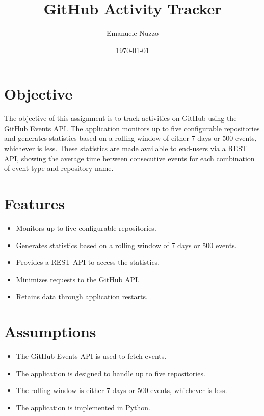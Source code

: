 \documentclass{article}
\title{GitHub Activity Tracker}
\author{Emanuele Nuzzo}
\date{\today}
\begin{document}
\maketitle

\section{Objective}
The objective of this assignment is to track activities on GitHub using the GitHub Events API. The application monitors up to five configurable repositories and generates statistics based on a rolling window of either 7 days or 500 events, whichever is less. These statistics are made available to end-users via a REST API, showing the average time between consecutive events for each combination of event type and repository name.

\section{Features}
\begin{itemize}
    \item Monitors up to five configurable repositories.
    \item Generates statistics based on a rolling window of 7 days or 500 events.
    \item Provides a REST API to access the statistics.
    \item Minimizes requests to the GitHub API.
    \item Retains data through application restarts.
\end{itemize}

\section{Assumptions}
\begin{itemize}
    \item The GitHub Events API is used to fetch events.
    \item The application is designed to handle up to five repositories.
    \item The rolling window is either 7 days or 500 events, whichever is less.
    \item The application is implemented in Python.
\end{itemize}
\end{document}

